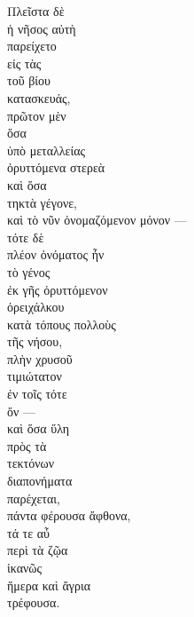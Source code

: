 {\large
\noindent Πλεῖστα δὲ \\
ἡ νῆσος αὐτὴ \\
παρείχετο \\
\tabto{2em} εἰς τὰς \\
\tabto{4em} τοῦ βίου\\
\tabto{2em} κατασκευάς, \\
πρῶτον μὲν \\
\tabto{2em} ὅσα \\
\tabto{4em} ὑπὸ μεταλλείας \\
\tabto{2em} ὀρυττόμενα στερεὰ \\
\tabto{2em} καὶ ὅσα \\
\tabto{2em} τηκτὰ γέγονε, \\
\tabto{2em} καὶ τὸ νῦν ὀνομαζόμενον μόνον —\\
\tabto{4em} τότε δὲ \\
\tabto{6em} πλέον ὀνόματος ἦν \\
\tabto{6em} τὸ γένος \\
\tabto{8em} ἐκ γῆς ὀρυττόμενον \\
\tabto{6em} ὀρειχάλκου \\
\tabto{8em} κατὰ τόπους πολλοὺς \\
\tabto{10em} τῆς νήσου, \\
\tabto{8em} πλὴν χρυσοῦ \\
\tabto{6em} τιμιώτατον \\
\tabto{8em} ἐν τοῖς τότε \\
\tabto{6em} ὄν —\\
\tabto{2em} καὶ ὅσα ὕλη \\
\tabto{4em} πρὸς τὰ \\
\tabto{6em} τεκτόνων\\
\tabto{4em} διαπονήματα \\
\tabto{2em} παρέχεται, \\
\tabto{4em} πάντα φέρουσα ἄφθονα, \\
\tabto{6em} τά τε αὖ \\
\tabto{8em} περὶ τὰ ζῷα \\
\tabto{6em} ἱκανῶς \\
\tabto{8em} ἥμερα καὶ ἄγρια \\
\tabto{6em} τρέφουσα. \\

}

